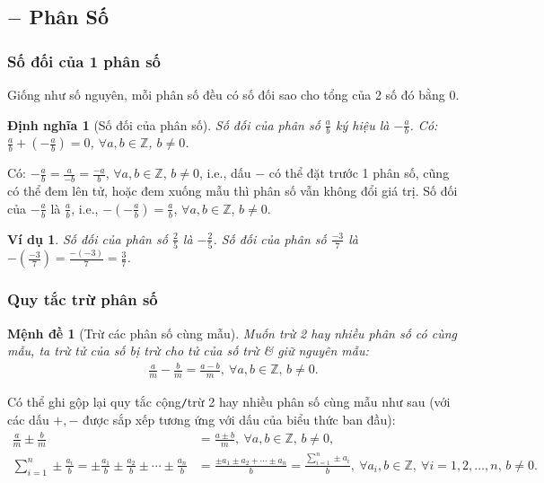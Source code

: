 \documentclass{article}
\newtheorem{dinhnghia}{Định nghĩa}
\newtheorem{menhde}{Mệnh đề}
\newtheorem{vidu}{Ví dụ}
\begin{document}
\subsection{$-$ Phân Số}

\subsubsection{Số đối của 1 phân số}
Giống như số nguyên, mỗi phân số đều có số đối sao cho tổng của 2 số đó bằng 0.

\begin{dinhnghia}[Số đối của phân số]
	\emph{Số đối} của phân số $\frac{a}{b}$ ký hiệu là $-\frac{a}{b}$. Có: $\frac{a}{b} + \left(-\frac{a}{b}\right) = 0$, $\forall a,b\in\mathbb{Z}$, $b\ne0$.
\end{dinhnghia}
Có: $-\frac{a}{b} = \frac{a}{-b} = \frac{-a}{b}$, $\forall a,b\in\mathbb{Z}$, $b\ne0$, i.e., dấu $-$ có thể đặt trước 1 phân số, cũng có thể đem lên tử, hoặc đem xuống mẫu thì phân số vẫn không đổi giá trị. Số đối của $-\frac{a}{b}$ là $\frac{a}{b}$, i.e., $-\left(-\frac{a}{b}\right) = \frac{a}{b}$, $\forall a,b\in\mathbb{Z}$, $b\ne0$.

\begin{vidu}
	Số đối của phân số $\frac{2}{5}$ là $-\frac{2}{5}$. Số đối của phân số $\frac{-3}{7}$ là $-\left(\frac{-3}{7}\right) = \frac{-(-3)}{7} = \frac{3}{7}$.
\end{vidu}

\subsubsection{Quy tắc trừ phân số}

\begin{menhde}[Trừ các phân số cùng mẫu]
	Muốn trừ 2 hay nhiều phân số có cùng mẫu, ta trừ tử của số bị trừ cho tử của số trừ \& giữ nguyên mẫu:
	\begin{align*}
		\frac{a}{m} - \frac{b}{m} = \frac{a - b}{m},\ \forall a,b\in\mathbb{Z},\,b\ne0.
	\end{align*}
\end{menhde}
Có thể ghi gộp lại quy tắc cộng\texttt{/}trừ 2 hay nhiều phân số cùng mẫu như sau (với các dấu $+,-$ được sắp xếp tương ứng với dấu của biểu thức ban đầu):
\begin{align*}
	\frac{a}{m}\pm\frac{b}{m} &= \frac{a\pm b}{m},\ \forall a,b\in\mathbb{Z},\,b\ne0,\\
	\sum_{i=1}^n \pm\frac{a_i}{b} = \pm\frac{a_1}{b}\pm\frac{a_2}{b}\pm\cdots\pm\frac{a_n}{b} &= \frac{\pm a_1\pm a_2 + \cdots\pm a_n}{b} = \frac{\sum_{i=1}^n \pm a_i}{b},\ \forall a_i,b\in\mathbb{Z},\ \forall i = 1,2,\ldots,n,\,b\ne0.
\end{align*}
\end{document}
